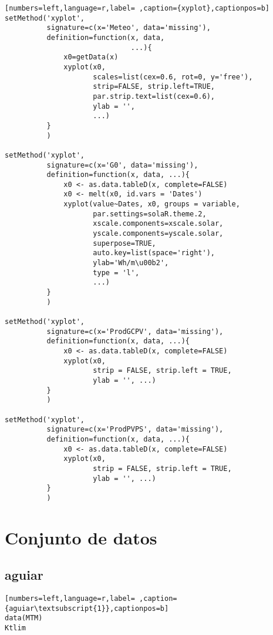 \begin{lstlisting}[numbers=left,language=r,label= ,caption={xyplot},captionpos=b]
setMethod('xyplot',
          signature=c(x='Meteo', data='missing'),
          definition=function(x, data,
                              ...){
              x0=getData(x)
              xyplot(x0,
                     scales=list(cex=0.6, rot=0, y='free'),
                     strip=FALSE, strip.left=TRUE,
                     par.strip.text=list(cex=0.6),
                     ylab = '',
                     ...)
          }
          )

setMethod('xyplot',
          signature=c(x='G0', data='missing'),
          definition=function(x, data, ...){
              x0 <- as.data.tableD(x, complete=FALSE)              
              x0 <- melt(x0, id.vars = 'Dates')
              xyplot(value~Dates, x0, groups = variable,
                     par.settings=solaR.theme.2,
                     xscale.components=xscale.solar,
                     yscale.components=yscale.solar,
                     superpose=TRUE,
                     auto.key=list(space='right'),
                     ylab='Wh/m\u00b2',
                     type = 'l',
                     ...)     
          }
          )

setMethod('xyplot',
          signature=c(x='ProdGCPV', data='missing'),
          definition=function(x, data, ...){
              x0 <- as.data.tableD(x, complete=FALSE)
              xyplot(x0,
                     strip = FALSE, strip.left = TRUE,
                     ylab = '', ...)
          }
          )

setMethod('xyplot',
          signature=c(x='ProdPVPS', data='missing'),
          definition=function(x, data, ...){
              x0 <- as.data.tableD(x, complete=FALSE)
              xyplot(x0,
                     strip = FALSE, strip.left = TRUE,
                     ylab = '', ...)
          }
          )
\end{lstlisting}
\section{Conjunto de datos}
\label{sec:org0cd117a}
\label{sec:conjunto-datos}
\subsection{aguiar}
\label{sec:org3c221e0}
\label{subsec:aguiar}
\begin{lstlisting}[numbers=left,language=r,label= ,caption={aguiar\textsubscript{1}},captionpos=b]
data(MTM)
Ktlim
\end{lstlisting}

